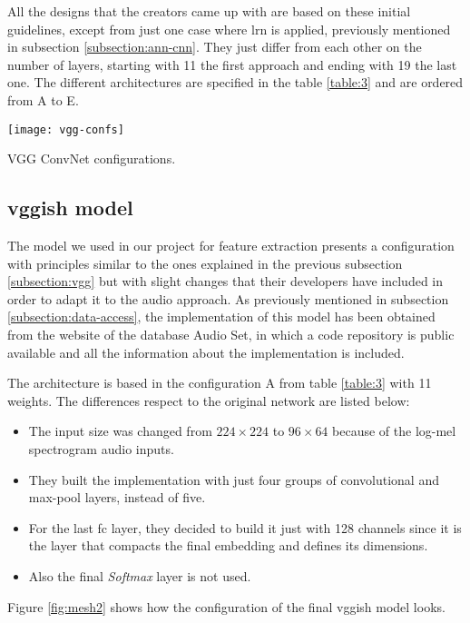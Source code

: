 	All the designs that the creators came up with are based on these initial guidelines, except from just one case where \acrfull{lrn} is applied, previously mentioned in subsection \ref{subsection:ann-cnn}. They just differ from each other on the number of layers, starting with 11 the first approach and ending with 19 the last one. The different architectures are specified in the table \ref{table:3} \cite{Simonyan2015} and are ordered from A to E.
	
	\begin{table}[t!]
		\begin{center}
			\captionsetup{justification=centering}
			\texttt{[image: vgg-confs]}
			\caption{VGG ConvNet configurations.}
			\label{table:3}
		\end{center}
	\end{table}

\subsection{\acrshort{vgg}ish model}
\label{subsection:vggish}

	The model we used in our project for feature extraction presents a configuration with principles similar to the ones explained in the previous subsection \ref{subsection:vgg} but with slight changes that their developers have included in order to adapt it to the audio approach. As previously mentioned in subsection \ref{subsection:data-access}, the implementation of this model has been obtained from the website of the database Audio Set, in which a code repository is public available \cite{Ellis2017} and all the information about the implementation is included.
	
	The architecture is based in the configuration A from table \ref{table:3} with 11 weights. The differences respect to the original network are listed below: 
	\begin{itemize}
		\item The input size was changed from $224 \times 224$ to $96 \times 64$ because of the log-mel spectrogram audio inputs.
		\item They built the implementation with just four groups of convolutional and max-pool layers, instead of five.
		\item For the last \acrshort{fc} layer, they decided to build it just with 128 channels since it is the layer that compacts the final embedding and defines its dimensions.
		\item Also the final \textit{Softmax} layer is not used.
	\end{itemize}
	Figure \ref{fig:mesh2} shows how the configuration of the final \acrshort{vgg}ish model looks.
	
